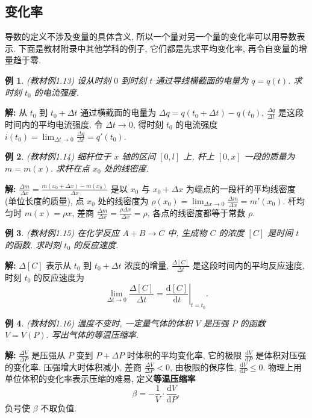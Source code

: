 \documentclass[UTF8,openany]{ctexbook}
\theoremstyle{chinesetextbook}
\newtheorem{example}{例}[section]
\newenvironment{cnsolution}{\par\indent\textbf{解:} \ignorespaces}{\par}
\newcommand{\dd}{\mathrm d}
\begin{document}
\subsection{变化率}
导数的定义不涉及变量的具体含义, 所以一个量对另一个量的变化率可以用导数表示. 下面是教材附录中其他学科的例子, 它们都是先求平均变化率, 再令自变量的增量趋于零.
\begin{example}\label{ex:c2-1-13}
\textnormal{(教材例1.13)} 设从时刻 $0$ 到时刻 $t$ 通过导线横截面的电量为 $q=q(t)$. 求时刻 $t_0$ 的电流强度.
\end{example}
\begin{cnsolution}
从 $t_0$ 到 $t_0+\Delta t$ 通过横截面的电量为 $\Delta q=q(t_0+\Delta t)-q(t_0)$, $\displaystyle\frac{\Delta q}{\Delta t}$ 是这段时间内的平均电流强度. 令 $\Delta t\to0$, 得时刻 $t_0$ 的电流强度 $\displaystyle i(t_0)=\lim_{\Delta t\to0}\frac{\Delta q}{\Delta t}=q'(t_0)$.
\end{cnsolution}
\begin{example}\label{ex:c2-1-14}
\textnormal{(教材例1.14)} 细杆位于 $x$ 轴的区间 $[0,l]$ 上, 杆上 $[0,x]$ 一段的质量为 $m=m(x)$. 求杆在点 $x_0$ 处的线密度.
\end{example}
\begin{cnsolution}
$\displaystyle\frac{\Delta m}{\Delta x}=\frac{m(x_0+\Delta x)-m(x_0)}{\Delta x}$ 是以 $x_0$ 与 $x_0+\Delta x$ 为端点的一段杆的平均线密度 (单位长度的质量), 点 $x_0$ 处的线密度为 $\displaystyle\rho(x_0)=\lim_{\Delta x\to0}\frac{\Delta m}{\Delta x}=m'(x_0)$. 杆均匀时 $m(x)=\rho x$, 差商 $\displaystyle\frac{\Delta m}{\Delta x}=\frac{\rho\Delta x}{\Delta x}=\rho$, 各点的线密度都等于常数 $\rho$.
\end{cnsolution}
\begin{example}\label{ex:c2-1-15}
\textnormal{(教材例1.15)} 在化学反应 $A+B\to C$ 中, 生成物 $C$ 的浓度 $[C]$ 是时间 $t$ 的函数. 求时刻 $t_0$ 的反应速度.
\end{example}
\begin{cnsolution}
$\Delta[C]$ 表示从 $t_0$ 到 $t_0+\Delta t$ 浓度的增量, $\displaystyle\frac{\Delta[C]}{\Delta t}$ 是这段时间内的平均反应速度, 时刻 $t_0$ 的反应速度为
\[
\lim_{\Delta t\to0}\frac{\Delta[C]}{\Delta t}=\left.\frac{\dd[C]}{\dd t}\right|_{t=t_0}.
\]
\end{cnsolution}
\begin{example}\label{ex:c2-1-16}
\textnormal{(教材例1.16)} 温度不变时, 一定量气体的体积 $V$ 是压强 $P$ 的函数 $V=V(P)$. 写出气体的等温压缩率.
\end{example}
\begin{cnsolution}
$\displaystyle\frac{\Delta V}{\Delta P}$ 是压强从 $P$ 变到 $P+\Delta P$ 时体积的平均变化率, 它的极限 $\displaystyle\frac{\dd V}{\dd P}$ 是体积对压强的变化率. 压强增大时体积减小, 差商 $\displaystyle\frac{\Delta V}{\Delta P}<0$, 由极限的保序性, $\displaystyle\frac{\dd V}{\dd P}\le0$. 物理上用单位体积的变化率表示压缩的难易, 定义\textbf{等温压缩率}
\[
\beta=-\frac1V\cdot\frac{\dd V}{\dd P},
\]
负号使 $\beta$ 不取负值.
\end{cnsolution}
\end{document}
